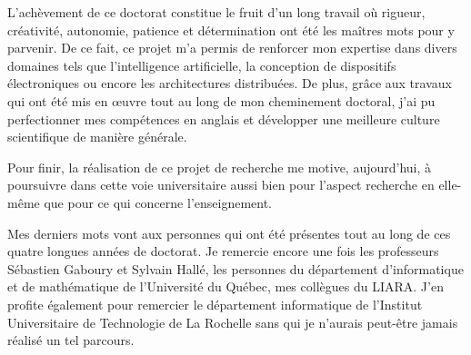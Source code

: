 L'achèvement de ce doctorat constitue le fruit d'un long travail où rigueur, créativité, autonomie, patience et détermination ont été les maîtres mots pour y parvenir. De ce fait, ce projet m'a permis de renforcer mon expertise dans divers domaines tels que l’intelligence artificielle, la conception de dispositifs électroniques ou encore les architectures distribuées. De plus, grâce aux travaux qui ont été mis en \oe{}uvre tout au long de mon cheminement doctoral, j'ai pu perfectionner mes compétences en anglais et développer une meilleure culture scientifique de manière générale.

Pour finir, la réalisation de ce projet de recherche me motive, aujourd'hui, à poursuivre dans cette voie universitaire aussi bien pour l'aspect recherche en elle-même que pour ce qui concerne l'enseignement.

Mes derniers mots vont aux personnes qui ont été présentes tout au long de ces quatre longues années de doctorat. Je remercie encore une fois les professeurs Sébastien Gaboury et Sylvain Hallé, les personnes du département d’informatique et de mathématique de l'Université du Québec, mes collègues du \acs{LIARA}. J'en profite également pour remercier le département informatique de l'Institut Universitaire de Technologie de La Rochelle sans qui je n'aurais peut-être jamais réalisé un tel parcours.
